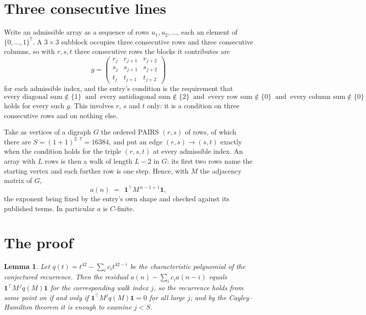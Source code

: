 \documentclass[11pt,a4paper]{article}
\theoremstyle{plain}
\newtheorem{lemma}[theorem]{Lemma}
\theoremstyle{definition}
\begin{document}
\section{Three consecutive lines}

Write an admissible array as a sequence of rows $u_1,u_2,\dots$, each an element of
$\{0,\dots,1\}^{7}$. A $3\times3$ subblock occupies three consecutive rows and
three consecutive columns, so with $r,s,t$ three consecutive rows the blocks it
contributes are
\[
g=\begin{pmatrix}r_j&r_{j+1}&r_{j+2}\\ s_j&s_{j+1}&s_{j+2}\\ t_j&t_{j+1}&t_{j+2}\end{pmatrix}
\]
for each admissible index, and the entry's condition is the requirement that
\[
\text{every diagonal sum} \notin \{1\}\ \text{ and }\ \text{every antidiagonal sum} \notin \{2\}\ \text{ and }\ \text{every row sum} \notin \{0\}\ \text{ and }\ \text{every column sum} \notin \{0\}
\]
holds for every such $g$. This involves $r$, $s$ and $t$ only: it is a condition on
three consecutive rows and on nothing else.

Take as vertices of a digraph $G$ the ordered PAIRS $(r,s)$ of rows, of which there are
$S=(1+1)^{2\cdot7}=16384$, and put an edge $(r,s)\to(s,t)$ exactly when the condition
holds for the triple $(r,s,t)$ at every admissible index. An array with $L$ rows is then a
walk of length $L-2$ in $G$: its first two rows name the starting vertex and each further
row is one step. Hence, with $M$ the adjacency matrix of $G$,
\[
a(n)\;=\;\,\mathbf{1}^{\!\top}M^{\,n-1+1}\mathbf{1},
\]
the exponent being fixed by the entry's own shape and checked against its published terms.
In particular $a$ is $C$-finite.

\section{The proof}

\begin{lemma}\label{lem:crit}
Let $q(t)=t^{42}-\sum_i c_it^{42-i}$ be the characteristic polynomial of the
conjectured recurrence. Then the residual $a(n)-\sum_ic_ia(n-i)$ equals
$\mathbf{1}^{\!\top}M^{\,j}q(M)\mathbf{1}$ for the corresponding walk index
$j$, so the recurrence holds from some point on if and only if
$\mathbf{1}^{\!\top}M^{j}q(M)\mathbf{1}=0$ for all large $j$; and by the
Cayley--Hamilton theorem it is enough to examine $j<S$.
\end{lemma}
\end{document}
